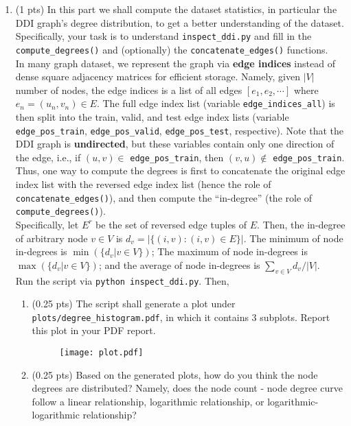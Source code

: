 \begin{enumerate}
\item
    (1 pts)
    In this part we shall compute the dataset statistics, in particular the DDI graph's degree distribution, to get a better understanding of the dataset. Specifically, your task is to understand \texttt{inspect\_ddi.py} and fill in the \texttt{compute\_degrees()} and (optionally) the \texttt{concatenate\_edges()} functions.
    \\
    In many graph dataset, we represent the graph via \textbf{edge indices} instead of dense square adjacency matrices for efficient storage. Namely, given $|V|$ number of nodes, the edge indices is a list of all edges $[e_{1}, e_{2}, \cdots]$ where $e_{n} = (u_n, v_n) \in E$. The full edge index list (variable \texttt{edge\_indices\_all}) is then split into the train, valid, and test edge index lists (variable \texttt{edge\_pos\_train}, \texttt{edge\_pos\_valid}, \texttt{edge\_pos\_test}, respective). Note that the DDI graph is \textbf{undirected}, but these variables contain only one direction of the edge, i.e., if $(u, v) \in$  \texttt{edge\_pos\_train}, then $(v, u) \not\in$ \texttt{edge\_pos\_train}. Thus, one way to compute the degrees is first to concatenate the original edge index list with the reversed edge index list (hence the role of \texttt{concatenate\_edges()}), and then compute the ``in-degree'' (the role of \texttt{compute\_degrees()}). 
    \\
    Specifically, let $E^r$ be the set of reversed edge tuples of $E$. Then, the in-degree of arbitrary node $v \in V$ is $d_{v} = |\{(i, v): (i, v) \in E\}|$.
    The minimum of node in-degrees is $\min(\{d_{v} | v \in V\})$; The maximum
    of node in-degrees is $\max(\{d_{v} | v \in V\})$; and the average of node
    in-degrees is $\sum_{v \in V} d_{v} / |V|$.
    \\
    Run the script via \texttt{python inspect\_ddi.py}. Then,
    \newpage
    \begin{enumerate}
        \item (0.25 pts) The script shall generate a plot under \texttt{plots/degree\_histogram.pdf}, in which it contains 3 subplots. Report this plot in your PDF report.
        \begin{figure}[h!]
            \centering
            \texttt{[image: plot.pdf]}
        \end{figure}
        \item (0.25 pts) Based on the generated plots, how do you think the node degrees are distributed? Namely, does the node count - node degree curve follow a linear relationship, logarithmic relationship, or logarithmic-logarithmic relationship?


\end{enumerate}
\end{enumerate}

